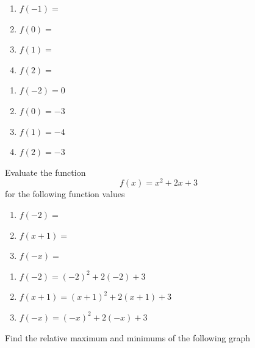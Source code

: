\documentclass[addpoints,12pt]{exam}
\begin{document}
\begin{questions}
\begin{enumerate}[label = \alph*)]
    \item $f(-1) =   $
		\item $f(0) =  $
		\item $f(1) = $
		\item $f(2) = $
\end{enumerate}

\begin{solution}
\begin{enumerate}[label = \alph*)j]
    \item $f(-2) = 0$
		\item $f(0) = -3$
		\item $f(1) = -4$
		\item $f(2) = -3$
\end{enumerate}
\end{solution}

\question Evaluate the function
\[
f(x)=x^{2}+2x+3
\]
for the following function values 
\begin{enumerate}[label = \alph*)]
    \item $f(-2)=$ 
		\item $f(x+1)=$
		\item $f(-x)=$
\end{enumerate}

\begin{solution}
     \begin{enumerate} [label = \alph*)]
         \item $f(-2) = (-2)^{2} + 2(-2) +3 $
				 \item $f(x+1) = (x+1)^{2}+2(x+1)+3 $
				 \item $f(-x) = (-x)^{2}+2(-x)+3 $
     \end{enumerate}
\end{solution}

\question Find the relative maximum and minimums of the following graph 


\end{questions}
\end{document}
